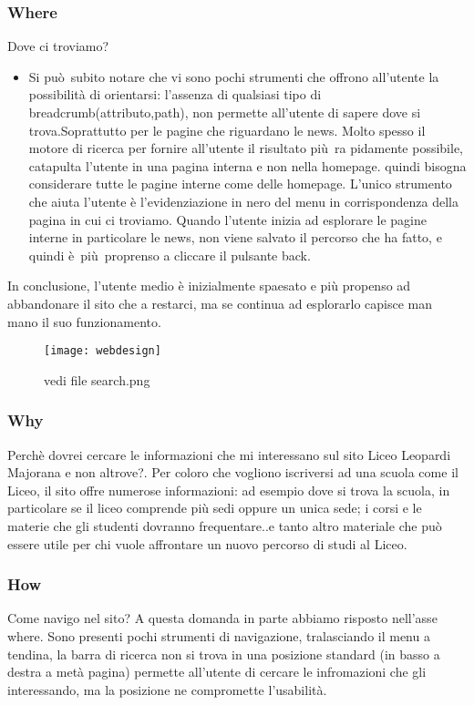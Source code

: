 \documentclass[12pt]{article}
\begin{document}
\subsubsection{Where} Dove ci troviamo?
\begin{itemize}
	\item Si pu\`o\ subito notare che vi sono pochi strumenti che offrono all'utente la possibilit\`a di orientarsi:
	l'assenza di qualsiasi tipo di breadcrumb(attributo,path), non permette all'utente
	di sapere dove si trova.Soprattutto per le pagine che riguardano le news. Molto spesso il motore di ricerca per fornire all'utente il risultato pi\`u\ ra pidamente possibile, catapulta l'utente in una pagina interna e non nella homepage. quindi bisogna considerare tutte le pagine interne come delle homepage.
	L'unico strumento che aiuta l'utente \`e l'evidenziazione in nero del menu in corrispondenza della pagina in cui ci troviamo.
	Quando l'utente inizia ad esplorare le pagine interne in particolare le news, non viene salvato il percorso che ha fatto, e quindi \`e\ pi\`u\ proprenso a cliccare il pulsante back.
\end{itemize}
In conclusione, l'utente medio \`e inizialmente spaesato e pi\`u propenso ad abbandonare il sito che a restarci, ma se continua ad esplorarlo capisce man mano il suo funzionamento.

\begin{figure}[ht!]
\centering
\texttt{[image: webdesign]}
\caption{vedi file search.png}
\end{figure} 

\subsubsection{Why} Perch\`e dovrei cercare le informazioni che mi interessano sul sito Liceo Leopardi Majorana e non altrove?. Per coloro che vogliono iscriversi ad una scuola come il Liceo, il sito offre numerose informazioni:
ad esempio dove si trova la scuola, in particolare se il liceo comprende pi\`u sedi oppure un unica sede; i corsi e le materie che gli studenti dovranno frequentare..e tanto altro materiale che pu\`o essere utile per chi vuole affrontare un nuovo percorso di studi al Liceo.
\subsubsection{How} Come navigo nel sito?
A questa domanda in parte abbiamo risposto nell'asse where.
Sono presenti pochi strumenti di navigazione, tralasciando il menu a tendina, la barra di ricerca non si trova in una posizione standard (in basso a destra a met\`a pagina) permette all'utente di cercare le infromazioni che gli interessando, ma la posizione ne compromette l'usabilit\`a.
\end{document}
